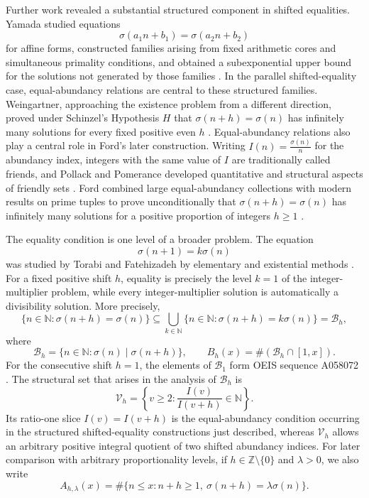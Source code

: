 \documentclass[11pt,reqno]{amsart}
\numberwithin{equation}{section}
\theoremstyle{plain}
\theoremstyle{definition}
\theoremstyle{remark}
\newcommand{\N}{\mathbb N}
\newcommand{\Z}{\mathbb Z}
\begin{document}
Further work revealed a substantial structured component in shifted equalities. Yamada studied equations
\[
\sigma(a_1n+b_1)=\sigma(a_2n+b_2)
\]
for affine forms, constructed families arising from fixed arithmetic cores and simultaneous primality conditions, and obtained a subexponential upper bound for the solutions not generated by those families \cite{Yamada2017}. In the parallel shifted-equality case, equal-abundancy relations are central to these structured families. Weingartner, approaching the existence problem from a different direction, proved under Schinzel's Hypothesis $H$ that $\sigma(n+h)=\sigma(n)$ has infinitely many solutions for every fixed positive even $h$ \cite{Weingartner2011}. Equal-abundancy relations also play a central role in Ford's later construction. Writing $I(n)=\frac{\sigma(n)}{n}$ for the abundancy index, integers with the same value of $I$ are traditionally called friends, and Pollack and Pomerance developed quantitative and structural aspects of friendly sets \cite{PollackPomerance2016}. Ford combined large equal-abundancy collections with modern results on prime tuples to prove unconditionally that $\sigma(n+h)=\sigma(n)$ has infinitely many solutions for a positive proportion of integers $h\ge1$ \cite{Ford2022}.

The equality condition is one level of a broader problem. The equation
\[
\sigma(n+1)=k\sigma(n)
\]
was studied by Torabi and Fatehizadeh by elementary and existential methods \cite{TorabiFatehizadeh2021}. For a fixed positive shift $h$, equality is precisely the level $k=1$ of the integer-multiplier problem, while every integer-multiplier solution is automatically a divisibility solution. More precisely,
\[
\{n\in\N:\sigma(n+h)=\sigma(n)\}
\subseteq
\bigcup_{k\in\N}\{n\in\N:\sigma(n+h)=k\sigma(n)\}
=
\mathcal B_h,
\]
where
\[
\mathcal B_h=\{n\in\N:\sigma(n)\mid\sigma(n+h)\},
\qquad
B_h(x)=\#(\mathcal B_h\cap[1,x]).
\]
For the consecutive shift $h=1$, the elements of $\mathcal B_1$
form OEIS sequence A058072 \cite{OEIS2026}. The structural set that arises in the analysis of $\mathcal B_h$ is
\[
\mathcal V_h
=
\left\{v\ge2:\frac{I(v)}{I(v+h)}\in\N\right\}.
\]
Its ratio-one slice $I(v)=I(v+h)$ is the equal-abundancy condition
occurring in the structured shifted-equality constructions just described,
whereas $\mathcal V_h$ allows an arbitrary positive integral quotient of
two shifted abundancy indices. For later comparison with arbitrary proportionality levels, if $h\in\Z\setminus\{0\}$ and $\lambda>0$, we also write
\[
A_{h,\lambda}(x)=\#\{n\le x:n+h\ge1,\ \sigma(n+h)=\lambda\sigma(n)\}.
\]
\end{document}
